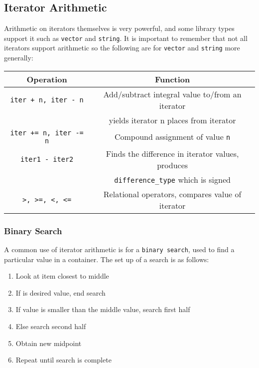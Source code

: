 \documentclass[12pt, a4paper]{report}
\begin{document}
\subsection{Iterator Arithmetic}
Arithmetic on iterators themselves is very powerful, and some library types support it such as \verb|vector| and \verb|string|.
It is important to remember that not all iterators support arithmetic so the following are for \verb|vector| and \verb|string| more generally:
\newline
\begin{center}
  \begin{tabular}{ |c|c| }
    \hline
    Operation & Function \\
    \hline
    \verb|iter + n, iter - n| & Add/subtract integral value to/from an iterator \\
                              & yields iterator n places from iterator \\
                              \hline
    \verb|iter += n, iter -= n| & Compound assignment of value \verb|n| \\
    \hline
    \verb|iter1 - iter2| & Finds the difference in iterator values, produces \\
                         & \verb|difference_type| which is signed \\
                         \hline
    \verb|>, >=, <, <=| & Relational operators, compares value of iterator \\
    \hline
  \end{tabular}
\end{center}
\subsubsection{Binary Search}
A common use of iterator arithmetic is for a \verb|binary search|, used to find a particular value in a container.
The set up of a search is as follows:
\begin{center}
  \begin{enumerate}
    \item Look at item closest to middle 
    \item If is desired value, end search
    \item If value is smaller than the middle value, search first half
    \item Else search second half
    \item Obtain new midpoint
    \item Repeat until search is complete
  \end{enumerate}
\end{center}
\end{document}
